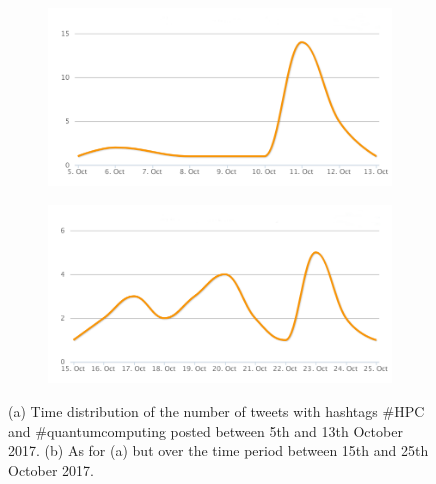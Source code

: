 \begin{figure}
 \centering
 \begin{subfigure}[b]{0.9\textwidth}
   \includegraphics[width=1\linewidth]{Images/FirstSearch_HPC-QuantumComputing.png}
   \caption{} 
 \end{subfigure}

 \begin{subfigure}[b]{0.9\textwidth}
   \includegraphics[width=1\linewidth]{Images/SecondSearch_HPC-QuantumComputing.png}
   \caption{}
 \end{subfigure}
 \caption{(a) Time distribution of the number of tweets with hashtags \#HPC and \#quantumcomputing posted between 5th and 13th October 2017. (b) As for (a) but over the time period between 15th and 25th October 2017.} 
 \label{First-SecondSearch_HPC-QuantumComputing}
\end{figure}
